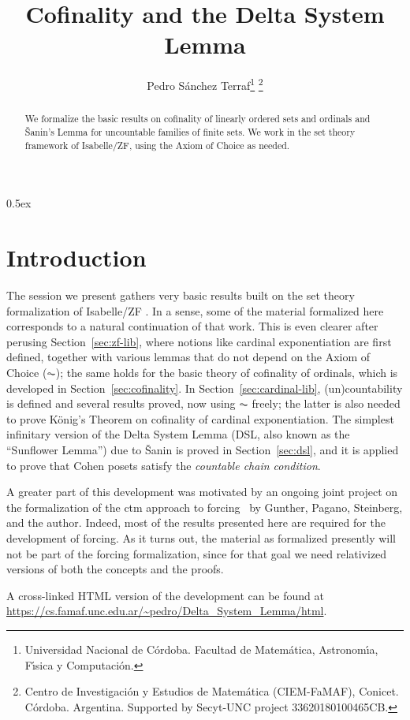 \documentclass[11pt,a4paper]{article}
\begin{document}
\title{Cofinality and the Delta System Lemma}
\author{
  Pedro S\'anchez Terraf\thanks{Universidad Nacional de C\'ordoba. 
    Facultad de Matem\'atica, Astronom\'{\i}a,  F\'{\i}sica y
    Computaci\'on.}
  \thanks{%
    Centro de Investigaci\'on y Estudios de Matem\'atica
    (CIEM-FaMAF), Conicet. C\'ordoba. Argentina.
    Supported by Secyt-UNC project 33620180100465CB.}
}
\maketitle

\begin{abstract}
  We formalize the basic results on cofinality of linearly ordered
  sets and ordinals and \v{S}anin's Lemma for uncountable families of
  finite sets. We work in the set theory framework of
  Isabelle/ZF, using the Axiom of Choice as needed.
\end{abstract}


\tableofcontents

\parindent 0pt\parskip 0.5ex

\section{Introduction}

The session we present gathers very basic results built on the set
theory formalization of Isabelle/ZF
\cite{DBLP:journals/jar/PaulsonG96}. In a sense, some of the material
formalized here corresponds to a natural continuation of that
work. This is even clearer after perusing Section~\ref{sec:zf-lib},
where notions like cardinal exponentiation are first defined, together
with various lemmas that do not depend on the Axiom of Choice ($\AC$);
the same holds for the basic theory of cofinality of ordinals, which
is developed in Section~\ref{sec:cofinality}. In
Section~\ref{sec:cardinal-lib}, (un)countability is defined
and several results proved, now using $\AC$ freely; the latter is also
needed to prove König's Theorem on cofinality of cardinal
exponentiation. The simplest infinitary version of the Delta
System Lemma (DSL, also known as the ``Sunflower Lemma'') due to  \v{S}anin
is proved in Section~\ref{sec:dsl}, and it is applied to prove
that Cohen posets satisfy the \emph{countable chain condition}.

A greater part of this development was motivated by an ongoing joint
project on the formalization of the ctm approach to
forcing~\cite{2020arXiv200109715G} by Gunther, Pagano, Steinberg, and
the author. Indeed, most of the results presented here are required
for the development of forcing. As it turns out, the material as
formalized presently will not be part of the forcing formalization,
since for that goal we need relativized versions of both the concepts
and the proofs.

A cross-linked HTML version of the development can be found at
\url{https://cs.famaf.unc.edu.ar/~pedro/Delta_System_Lemma/html}.





\end{document}
